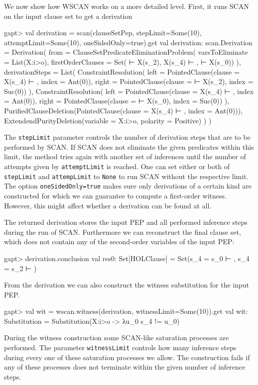 \documentclass[a4paper,11pt]{book}
\begin{document}
We now show how WSCAN works on a more detailed level.
First, it runs SCAN on the input clause set to get a derivation
\begin{clilisting}
gapt> val derivation = scan(clauseSetPep, stepLimit=Some(10), attemptLimit=Some(10), oneSidedOnly=true).get
val derivation: scan.Derivation = Derivation(
  from = ClauseSetPredicateEliminationProblem(
    varsToEliminate = List(X:i>o),
    firstOrderClauses = Set( ⊢ X(s_2), X(s_4) ⊢ ,  ⊢ X(s_0))
  ),
  derivationSteps = List(
    ConstraintResolution(
      left = PointedClause(clause = X(s_4) ⊢ , index = Ant(0)),
      right = PointedClause(clause =  ⊢ X(s_2), index = Suc(0))
    ),
    ConstraintResolution(
      left = PointedClause(clause = X(s_4) ⊢ , index = Ant(0)),
      right = PointedClause(clause =  ⊢ X(s_0), index = Suc(0))
    ),
    PurifiedClauseDeletion(PointedClause(clause = X(s_4) ⊢ , index = Ant(0))),
    ExtendendPurityDeletion(variable = X:i>o, polarity = Positive)
  )
)

\end{clilisting}
The \texttt{stepLimit} parameter controls the number of derivation steps that are to be performed by SCAN.
If SCAN does not eliminate the given predicates within this limit, the method tries again with another set of inferences until the number of attempts given by \texttt{attemptLimit} is reached.
One can set either or both of \texttt{stepLimit} and \texttt{attempLimit} to \texttt{None} to run SCAN without the respective limit.
The option \texttt{oneSidedOnly=true} makes sure only derivations of a certain kind are constructed for which we can guarantee to compute a first-order witness.
However, this might affect whether a derivation can be found at all.

The returned derivation stores the input PEP and all performed inference steps during the run of SCAN.
Furthermore we can reconstruct the final clause set, which does not contain any of the second-order variables of the input PEP:
\begin{clilisting}
gapt> derivation.conclusion
val res0: Set[HOLClause] = Set(s_4 = s_0 ⊢ , s_4 = s_2 ⊢ )

\end{clilisting}
From the derivation we can also construct the witness substitution for the input PEP.
\begin{clilisting}
gapt> val wit = wscan.witness(derivation, witnessLimit=Some(10)).get
val wit: Substitution = Substitution(X:i>o -> λu_0 s_4 != u_0)

\end{clilisting}
During the witness construction some SCAN-like saturation processes are performed.
The parameter \texttt{witnessLimit} controls how many inference steps during every one of these saturation processes we allow.
The construction fails if any of these processes does not terminate within the given number of inference steps.
\end{document}
